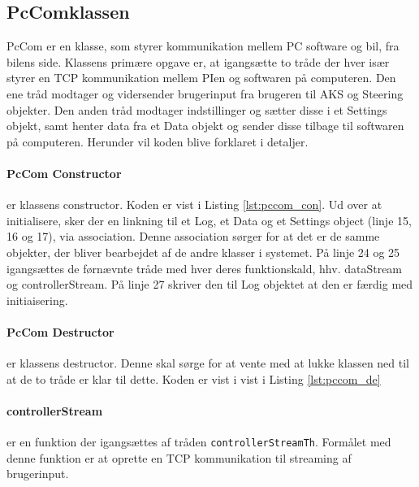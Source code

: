 \subsection{PcComklassen} \label{sec:pccom_impl}

PcCom er en klasse, som styrer kommunikation mellem PC software og bil, fra bilens side. Klassens primære opgave er, at igangsætte to tråde der hver især styrer en TCP kommunikation mellem PIen og softwaren på computeren. Den ene tråd modtager og vidersender brugerinput fra brugeren til AKS og Steering objekter. Den anden tråd modtager indstillinger og sætter disse i et Settings objekt, samt henter data fra et Data objekt og sender disse tilbage til softwaren på computeren.
Herunder vil koden blive forklaret i detaljer.


\paragraph{PcCom Constructor} er klassens constructor. Koden er vist i Listing \ref{lst:pccom_con}. Ud over at initialisere, sker der en linkning til et Log, et Data og et Settings object (linje 15, 16 og 17), via association. Denne association sørger for at det er de samme objekter, der bliver bearbejdet af de andre klasser i systemet. På linje 24 og 25 igangsættes de førnævnte tråde med hver deres funktionskald, hhv. dataStream og controllerStream. På linje 27 skriver den til Log objektet at den er færdig med initiaisering.



\paragraph{PcCom Destructor} er klassens destructor. Denne skal sørge for at vente med at lukke klassen ned til at de to tråde er klar til dette. Koden er vist i vist i Listing \ref{lst:pccom_de}



\clearpage

\paragraph{controllerStream} er en funktion der igangsættes af tråden \texttt{controllerStreamTh}. Formålet med denne funktion er at oprette en TCP kommunikation til streaming af brugerinput.

